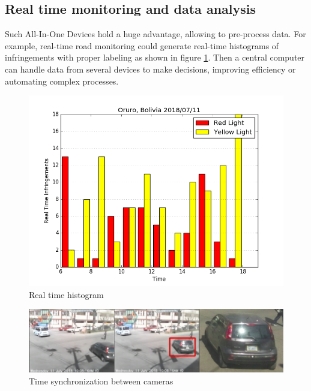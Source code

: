 \documentclass[fleqn,12pt]{SelfArx} %
\begin{document}
\subsection{Real time monitoring and data analysis}

Such All-In-One Devices hold a huge advantage, allowing to pre-process data. For example,
real-time road monitoring could generate real-time histograms of infringements with proper labeling as shown in figure \ref{fig:histogram}. Then a central computer can handle data from several devices to make decisions, improving efficiency or automating complex processes.

\begin{figure}[t]\centering
	\includegraphics[width=\linewidth]{images/histogram}
	\caption{Real time histogram}
	\label{fig:histogram}
\end{figure}

\begin{figure}[ht]\centering %
	\includegraphics[width=\linewidth]{images/sync}
	\caption{Time synchronization between cameras}
	\label{fig:sync}
\end{figure}
\end{document}
